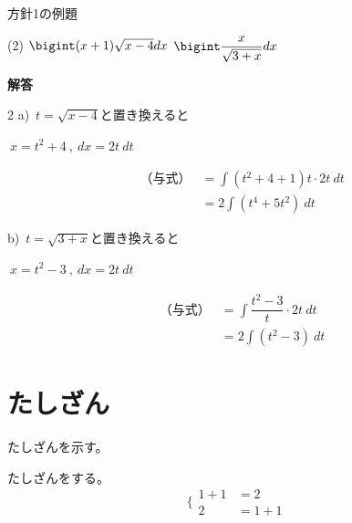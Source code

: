 \documentclass[dvipdfmx]{jsarticle}
\newenvironment{qbox}[1]{ %
    \begin{tcolorbox}[
        colframe = RoyalBlue,
        colback = RoyalBlue!10!White,
        title = {#1},
        fonttitle = \bfseries,
        breakable = true
    ]
}{
    \end{tcolorbox}
}
\begin{document}
\begin{itembox}[l]{方針1の例題}
\begin{tasks}(2)
\task $\bigint (x+1)\sqrt{x-4}dx$
\task $\bigint \dfrac{x}{\sqrt{3+x}}dx$
\end{tasks}
\end{itembox}

\bf{解答}
\begin{multicols}{2}
a)\ $t=\sqrt{x-4} \mbox{と置き換えると}$

$\ x=t^2+4\ ,\ dx=2t\ dt $

\begin{eqnarray*}
&\mbox{（与式）}&=\int (t^2+4+1)t \cdot 2t\ dt\\
&&=2\int (t^4+5t^2) \ dt
\end{eqnarray*}

\vspace{0.5cm}

b)\ $t=\sqrt{3+x} \mbox{と置き換えると}$

$\ x=t^2-3\ ,\ dx=2t\ dt $

\begin{eqnarray*}
&\mbox{（与式）}&=\int \dfrac{t^2-3}{t}\cdot 2t \ dt\\
&&=2\int (t^2-3) \ dt
\end{eqnarray*}

\end{multicols} 




\section{たしざん}
たしざんを示す。
\begin{qbox}{たしざん}
    たしざんをする。
    \begin{equation*}
        \Biggl\lbrace
        \begin{alignedat}{2}
            1+1 &= 2 \\
            2 &= 1+1
        \end{alignedat}
    \end{equation*}
\end{qbox}
\end{document}

